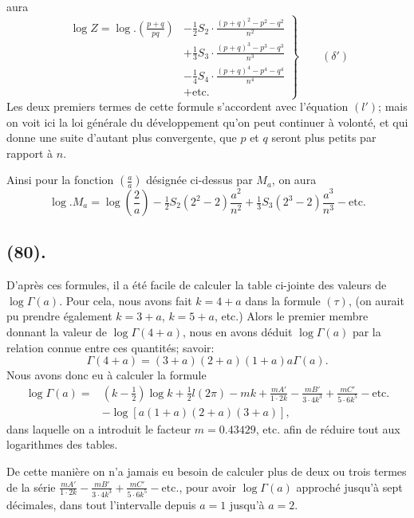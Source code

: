 \documentclass{article}
\begin{document}
aura
\[ \left.\begin{aligned} \log Z=\log.\left(\frac{p+q}{pq}\right)&-\tfrac{1}{2}S_{2}\cdot\frac{(p+q)^{2}-p^{2}-q^{2}}{n^{2}}\\ &+\tfrac{1}{3}S_{3}\cdot\frac{(p+q)^{3}-p^{3}-q^{3}}{n^{3}}\\ &-\tfrac{1}{4}S_{4}\cdot\frac{(p+q)^{4}-p^{4}-q^{4}}{n^{4}}\\ &+\text{etc.} \end{aligned}\right\}\qquad(\delta') \]
Les deux premiers termes de cette formule s'accordent avec l'équation $(l')$; mais on voit ici la loi générale du développement qu'on peut continuer à volonté, et qui donne une suite d'autant plus convergente, que $p$ et $q$ seront plus petits par rapport à $n$.

Ainsi pour la fonction $\left(\frac{a}{a}\right)$ désignée ci-dessus par $M_{a}$, on aura
\[ \log.M_{a}=\log\left(\frac{2}{a}\right)-\tfrac{1}{2}S_{2}(2^{2}-2)\frac{a^{2}}{n^{2}}+\tfrac{1}{3}S_{3}(2^{3}-2)\frac{a^{3}}{n^{3}}-\text{etc.} \]

\subsection*{(80).}

D'après ces formules, il a été facile de calculer la table ci-jointe des valeurs de $\log\Gamma(a)$. Pour cela, nous avons fait $k=4+a$ dans la formule $(\tau)$, (on aurait pu prendre également $k=3+a$, $k=5+a$, etc.) Alors le premier membre donnant la valeur de $\log\Gamma(4+a)$, nous en avons déduit $\log\Gamma(a)$ par la relation connue entre ces quantités; savoir:
\[ \Gamma(4+a)=(3+a)(2+a)(1+a)a\Gamma(a). \]
Nous avons donc eu à calculer la formule
\[ \begin{aligned} \log\Gamma(a)={}&\left(k-\tfrac{1}{2}\right)\log k+\tfrac{1}{2}l(2\pi)-mk+\frac{mA'}{1\cdot2k}-\frac{mB'}{3\cdot4k^{3}}+\frac{mC'}{5\cdot6k^{5}}-\text{etc.}\\ &-\log[a(1+a)(2+a)(3+a)], \end{aligned} \]
dans laquelle on a introduit le facteur $m=0.43429$, etc. afin de réduire tout aux logarithmes des tables.

De cette manière on n'a jamais eu besoin de calculer plus de deux ou trois termes de la série $\frac{mA'}{1\cdot2k}-\frac{mB'}{3\cdot4k^{3}}+\frac{mC'}{5\cdot6k^{5}}-\text{etc.}$, pour avoir $\log\Gamma(a)$ approché jusqu'à sept décimales, dans tout l'intervalle depuis $a=1$ jusqu'à $a=2$.
\end{document}
